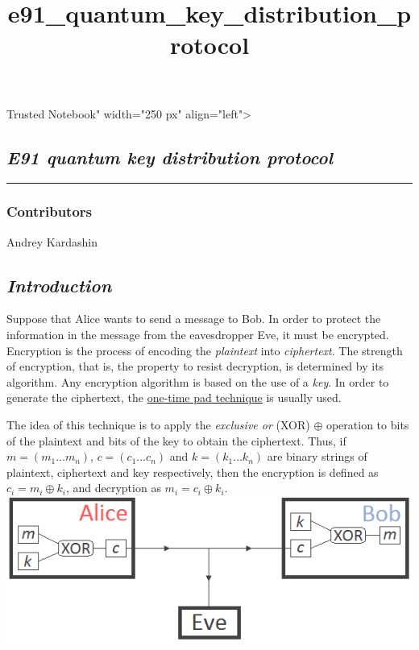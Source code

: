\documentclass[11pt]{article}
\title{e91\_quantum\_key\_distribution\_protocol}
\makeatletter
\def\maxwidth{\ifdim\Gin@nat@width>\linewidth\linewidth
    \else\Gin@nat@width\fi}
\let\Oldincludegraphics\includegraphics
\renewcommand{\includegraphics}[1]{\Oldincludegraphics[width=.8\maxwidth]{#1}}
\makeatother
\begin{document}
    
    
    \maketitle
    
    

    
     Trusted Notebook" width="250 px" align="left"\textgreater{}

    \subsection{\texorpdfstring{\emph{\emph{E91 quantum key distribution
protocol}}}{E91 quantum key distribution protocol}}\label{e91-quantum-key-distribution-protocol}

\begin{center}\rule{0.5\linewidth}{\linethickness}\end{center}

\subsubsection{Contributors}\label{contributors}

Andrey Kardashin

    \subsection{\texorpdfstring{\emph{Introduction}}{Introduction}}\label{introduction}

    Suppose that Alice wants to send a message to Bob. In order to protect
the information in the message from the eavesdropper Eve, it must be
encrypted. Encryption is the process of encoding the \emph{plaintext}
into \emph{ciphertext}. The strength of encryption, that is, the
property to resist decryption, is determined by its algorithm. Any
encryption algorithm is based on the use of a \emph{key}. In order to
generate the ciphertext, the
\href{https://en.wikipedia.org/wiki/One-time_pad}{one-time pad
technique} is usually used.

The idea of this technique is to apply the \emph{exclusive or} (XOR)
\(\oplus\) operation to bits of the plaintext and bits of the key to
obtain the ciphertext. Thus, if \(m=(m_1 \ldots m_n)\),
\(c=(c_1 \ldots c_n)\) and \(k=(k_1 \ldots k_n)\) are binary strings of
plaintext, ciphertext and key respectively, then the encryption is
defined as \(c_i=m_i \oplus k_i\), and decryption as
\(m_i=c_i \oplus k_i\). \includegraphics{images/one-time_pad.png}
\end{document}
